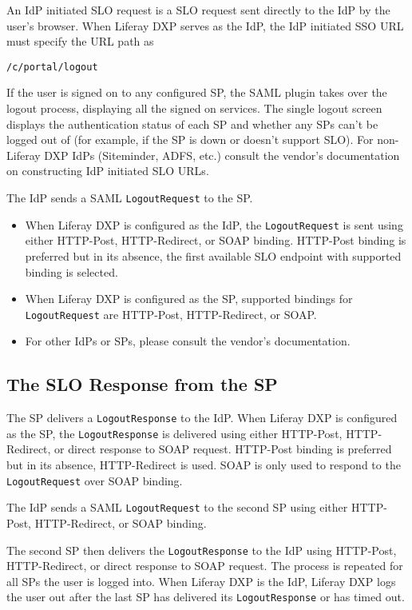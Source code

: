 An IdP initiated SLO request is a SLO request sent directly to the IdP
by the user's browser. When Liferay DXP serves as the IdP, the IdP
initiated SSO URL must specify the URL path as

\texttt{/c/portal/logout}

If the user is signed on to any configured SP, the SAML plugin takes
over the logout process, displaying all the signed on services. The
single logout screen displays the authentication status of each SP and
whether any SPs can't be logged out of (for example, if the SP is down
or doesn't support SLO). For non-Liferay DXP IdPs (Siteminder, ADFS,
etc.) consult the vendor's documentation on constructing IdP initiated
SLO URLs.

The IdP sends a SAML \texttt{LogoutRequest} to the SP.

\begin{itemize}
\tightlist
\item
  When Liferay DXP is configured as the IdP, the \texttt{LogoutRequest}
  is sent using either HTTP-Post, HTTP-Redirect, or SOAP binding.
  HTTP-Post binding is preferred but in its absence, the first available
  SLO endpoint with supported binding is selected.
\item
  When Liferay DXP is configured as the SP, supported bindings for
  \texttt{LogoutRequest} are HTTP-Post, HTTP-Redirect, or SOAP.
\item
  For other IdPs or SPs, please consult the vendor's documentation.
\end{itemize}

\subsection{The SLO Response from the
SP}\label{the-slo-response-from-the-sp}

The SP delivers a \texttt{LogoutResponse} to the IdP. When Liferay DXP
is configured as the SP, the \texttt{LogoutResponse} is delivered using
either HTTP-Post, HTTP-Redirect, or direct response to SOAP request.
HTTP-Post binding is preferred but in its absence, HTTP-Redirect is
used. SOAP is only used to respond to the \texttt{LogoutRequest} over
SOAP binding.

The IdP sends a SAML \texttt{LogoutRequest} to the second SP using
either HTTP-Post, HTTP-Redirect, or SOAP binding.

The second SP then delivers the \texttt{LogoutResponse} to the IdP using
HTTP-Post, HTTP-Redirect, or direct response to SOAP request. The
process is repeated for all SPs the user is logged into. When Liferay
DXP is the IdP, Liferay DXP logs the user out after the last SP has
delivered its \texttt{LogoutResponse} or has timed out.

